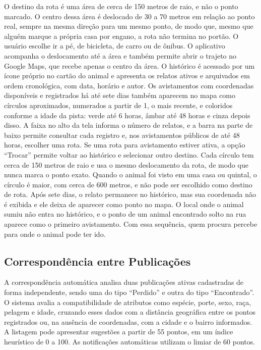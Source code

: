 O destino da rota é uma área de cerca de 150 metros de raio, e não o ponto marcado. O centro dessa área é deslocado de 30 a 70 metros em relação ao ponto real, sempre na mesma direção para um mesmo ponto, de modo que, mesmo que alguém marque a própria casa por engano, a rota não termina no portão. O usuário escolhe ir a pé, de bicicleta, de carro ou de ônibus. O aplicativo acompanha o deslocamento até a área e também permite abrir o trajeto no Google Maps, que recebe apenas o centro da área. O histórico é acessado por um ícone próprio no cartão do animal e apresenta os relatos ativos e arquivados em ordem cronológica, com data, horário e autor. Os avistamentos com coordenadas disponíveis e registrados há até sete dias também aparecem no mapa como círculos aproximados, numerados a partir de 1, o mais recente, e coloridos conforme a idade da pista: verde até 6 horas, âmbar até 48 horas e cinza depois disso. A faixa no alto da tela informa o número de relatos, e a barra na parte de baixo permite consultar cada registro e, nos avistamentos públicos de até 48 horas, escolher uma rota. Se uma rota para avistamento estiver ativa, a opção ``Trocar'' permite voltar ao histórico e selecionar outro destino. Cada círculo tem cerca de 150 metros de raio e usa o mesmo deslocamento da rota, de modo que nunca marca o ponto exato. Quando o animal foi visto em uma casa ou quintal, o círculo é maior, com cerca de 600 metros, e não pode ser escolhido como destino de rota. Após sete dias, o relato permanece no histórico, mas sua coordenada não é exibida e ele deixa de aparecer como ponto no mapa. O local onde o animal sumiu não entra no histórico, e o ponto de um animal encontrado solto na rua aparece como o primeiro avistamento. Com essa sequência, quem procura percebe para onde o animal pode ter ido.

\subsection{Correspondência entre Publicações}\label{sec:correspondencia}

A correspondência automática analisa duas publicações ativas cadastradas de forma independente, sendo uma do tipo ``Perdido'' e outra do tipo ``Encontrado''. O sistema avalia a compatibilidade de atributos como espécie, porte, sexo, raça, pelagem e idade, cruzando esses dados com a distância geográfica entre os pontos registrados ou, na ausência de coordenadas, com a cidade e o bairro informados. A listagem pode apresentar sugestões a partir de 55 pontos, em um índice heurístico de 0 a 100. As notificações automáticas utilizam o limiar de 60 pontos.

